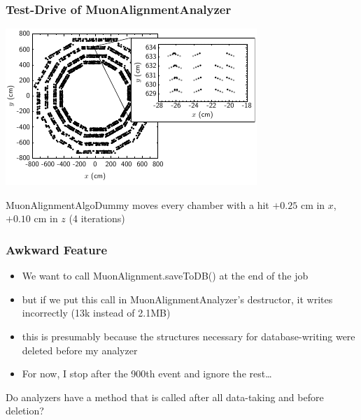 \documentclass[12pt,compress]{beamer}
\begin{document}
\begin{frame}
\frametitle{Test-Drive of MuonAlignmentAnalyzer}
\begin{center}
\includegraphics[width=0.85\linewidth]{misalignment_analyzer}

MuonAlignmentAlgoDummy moves every chamber with a hit $+0.25$ cm in $x$, $+0.10$ cm in $z$ (4 iterations)
\end{center}
\end{frame}

\begin{frame}
\frametitle{Awkward Feature}

\begin{itemize}
\item We want to call MuonAlignment.saveToDB() at the end of the job
\item but if we put this call in MuonAlignmentAnalyzer's destructor, it writes incorrectly (13k instead of 2.1MB)
\item this is presumably because the structures necessary for database-writing were deleted before my analyzer
\item For now, I stop after the 900th event and ignore the rest\ldots
\end{itemize}

\vfill
Do analyzers have a method that is called after all data-taking and before deletion?
\end{frame}
\end{document}

